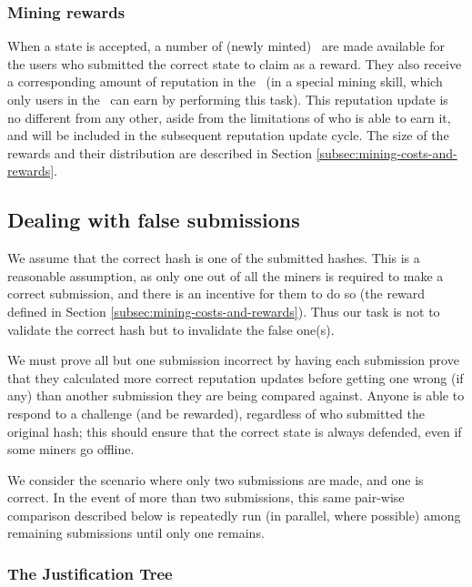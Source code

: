 \subsubsection*{Mining rewards}

When a state is accepted, a number of (newly minted) \rcts\ are made available for the users who submitted the correct state to claim as a reward. They also receive a corresponding amount of reputation in the \rc\ (in a special mining skill, which only users in the \rc\ can earn by performing this task). This reputation update is no different from any other, aside from the limitations of who is able to earn it, and will be included in the subsequent reputation update cycle. The size of the rewards and their distribution are described in Section \ref{subsec:mining-costs-and-rewards}.

\subsection{Dealing with false submissions}\label{sec:challenge-response}

We assume that the correct hash is one of the  submitted hashes. This is a reasonable assumption, as only one out of all the miners is required to make a correct submission, and there is an incentive for them to do so (the reward defined in Section \ref{subsec:mining-costs-and-rewards}). Thus our task is not to validate the correct hash but to invalidate the false one(s).

We must prove all but one submission incorrect by having each submission prove that they calculated more correct reputation updates before getting one wrong (if any) than another submission they are being compared against. Anyone is able to respond to a challenge (and be rewarded), regardless of who submitted the original hash; this should ensure that the correct state is always defended, even if some miners go offline.

We consider the scenario where only two submissions are made, and one is correct. In the event of more than two submissions, this same pair-wise comparison described below is repeatedly run (in parallel, where possible) among remaining submissions until only one remains.

\subsubsection{The Justification Tree}\label{sec:justificationTree}
\newcommand{\jrh}{\ensuremath{\mathbb{JRH}}}

